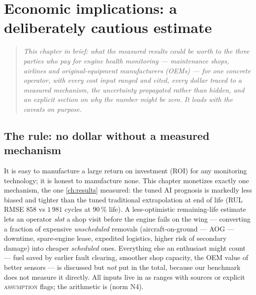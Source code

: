 \chapter{Economic implications: a deliberately cautious estimate}
\label{ch:economics}

\begin{quote}\itshape
This chapter in brief: what the measured results could be worth to the three parties who pay
for engine health monitoring --- maintenance shops, airlines and original-equipment
manufacturers (OEMs) --- for one concrete
operator, with every cost input ranged and cited, every dollar traced to a measured
mechanism, the uncertainty propagated rather than hidden, and an explicit section on why the
number might be zero. It leads with the caveats on purpose.
\end{quote}


\section{The rule: no dollar without a measured mechanism}
\label{sec:econ-rule}

It is easy to manufacture a large return on investment (ROI) for any monitoring technology; it is honest to
manufacture none. This chapter monetizes exactly one mechanism, the one \cref{ch:results}
measured: the tuned AI prognosis is markedly less biased and tighter than the tuned
traditional extrapolation at end of life (RUL RMSE $858$ vs $1\,981$ cycles at $90\,\%$
life). A less-optimistic remaining-life estimate lets an operator \emph{slot} a shop visit
before the engine fails on the wing --- converting a fraction of expensive
\emph{unscheduled} removals (aircraft-on-ground --- AOG --- downtime, spare-engine lease,
expedited logistics, higher risk of secondary damage) into cheaper \emph{scheduled} ones. Everything else an enthusiast might
count --- fuel saved by earlier fault clearing, smoother shop capacity, the OEM value of
better sensors --- is discussed but \emph{not} put in the total, because our benchmark does
not measure it directly. All inputs live in  as ranges
with sources or explicit \textsc{assumption} flags; the arithmetic is
 (norm N4).

